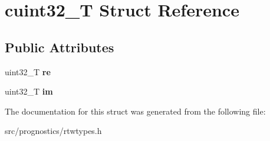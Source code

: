 \hypertarget{structcuint32__T}{}\section{cuint32\+\_\+T Struct Reference}
\label{structcuint32__T}
\subsection*{Public Attributes}
\begin{DoxyCompactItemize}
\item 
\mbox{\label{structcuint32__T_a802b72d2b30b9fdefa2e50297eb11ffe}} 
uint32\+\_\+T {\bfseries re}
\item 
\mbox{\label{structcuint32__T_a36154238ecd7aeae08d8bdbfde61ec68}} 
uint32\+\_\+T {\bfseries im}
\end{DoxyCompactItemize}


The documentation for this struct was generated from the following file\+:\begin{DoxyCompactItemize}
\item 
src/prognostics/rtwtypes.\+h\end{DoxyCompactItemize}
